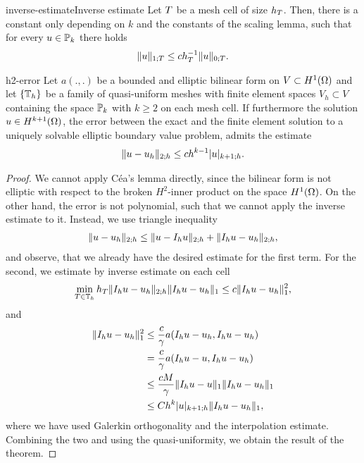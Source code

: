 \begin{Lemma*}{inverse-estimate}{Inverse estimate}
  Let $\cell$ be a mesh cell of size $h_\cell$. Then, there is a
  constant only depending on $k$ and the constants of the scaling
  lemma, such that for every $u\in \P_k$ there holds
  \begin{gather}
    \norm{u}_{1;\cell} \le c h_T^{-1} \norm{u}_{0;\cell}.
  \end{gather}
\end{Lemma*}

\begin{Theorem}{h2-error}
  Let $a(.,.)$ be a bounded and elliptic bilinear form on
  $V\subset H^1(\domain)$ and let $\{\mesh_h\}$ be a family of
  quasi-uniform meshes with finite element spaces $V_h \subset V$
  containing the space $\P_k$ with $k\ge 2$ on each mesh cell. If
  furthermore the solution $u\in H^{k+1}(\domain)$, the error between
  the exact and the finite element solution to a uniquely solvable
  elliptic boundary value problem, admits the estimate
  \begin{gather}
    \norm{u-u_h}_{2;h} \le c h^{k-1} \snorm{u}_{k+1;h}.
  \end{gather}  
\end{Theorem}

\begin{proof}
  We cannot apply Céa's lemma directly, since the bilinear form is not
  elliptic with respect to the broken $H^2$-inner product on the space
  $H^1(\domain)$. On the other hand, the error is not polynomial, such
  that we cannot apply the inverse estimate to it. Instead, we use
  triangle inequality
  \begin{gather*}
    \norm{u-u_h}_{2;h} \le \norm{u-I_h u}_{2;h} + \norm{I_h u-u_h}_{2;h},
  \end{gather*}
  and observe, that we already have the desired estimate for the first
  term. For the second, we estimate by inverse estimate on each cell
  \begin{gather*}
    \min_{\cell\in\mesh_h} h_T \norm{I_h u-u_h}_{2;h}
    \norm{I_hu-u_h}_{1} \le c \norm{I_h u-u_h}_{1}^2,
  \end{gather*}
  and
  \begin{align*}
    \norm{I_h u-u_h}_{1}^2
    & \le \frac c\gamma a(I_h u-u_h, I_h u-u_h)
    \\& = \frac c\gamma a(I_h u-u, I_h u-u_h)
    \\& \le \frac{cM}{\gamma}\norm{I_h u-u}_{1} \norm{I_h u-u_h}_{1}
    \\& \le C h^{k} \snorm{u}_{k+1;h} \norm{I_h u-u_h}_{1},
  \end{align*}
  where we have used Galerkin orthogonality and the interpolation
  estimate. Combining the two and using the quasi-uniformity, we
  obtain the result of the theorem.
\end{proof}

